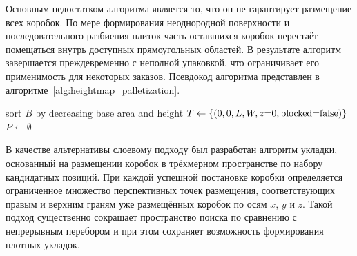 Основным недостатком алгоритма является то, что он не гарантирует размещение всех коробок. По мере формирования неоднородной поверхности и последовательного разбиения плиток часть оставшихся коробок перестаёт помещаться внутрь доступных прямоугольных областей. В результате алгоритм завершается преждевременно с неполной упаковкой, что ограничивает его применимость для некоторых заказов. Псевдокод алгоритма представлен в алгоритме~\ref{alg:heightmap_palletization}.

\begin{algorithm}[H]
\caption{Height-map palletization}
\label{alg:heightmap_palletization}

sort $B$ by decreasing base area and height\;
$T \leftarrow \{(0,0,L,W,z{=}0,\textnormal{blocked}{=}\textnormal{false})\}$\;
$P \leftarrow \emptyset$\;

\;
\end{algorithm}


В качестве альтернативы слоевому подходу был разработан алгоритм укладки, основанный на размещении коробок в трёхмерном пространстве по набору кандидатных позиций. При каждой успешной постановке коробки определяется ограниченное множество перспективных точек размещения, соответствующих правым и верхним граням уже размещённых коробок по осям $x$, $y$ и $z$. Такой подход существенно сокращает пространство поиска по сравнению с непрерывным перебором и при этом сохраняет возможность формирования плотных укладок.

